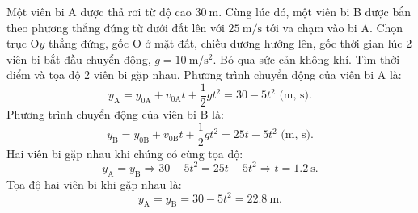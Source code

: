 \begin{enumerate}[label=\bfseries Câu \arabic*:]
\cauhoi
{Một viên bi A được thả rơi từ độ cao $\SI{30}{\meter}$. Cùng lúc đó, một viên bi B được bắn theo phương thẳng đứng từ dưới đất lên với $\SI{25}{\meter/\second}$ tới va chạm vào bi A. Chọn trục O$y$ thẳng đứng, gốc O ở mặt đất, chiều dương hướng lên, gốc thời gian lúc 2 viên bi bắt đầu chuyển động, $g=\SI{10}{\meter/\second^2}$. Bỏ qua sức cản không khí. Tìm thời điểm và tọa độ 2 viên bi gặp nhau.
}
\loigiai
{	Phương trình chuyển động của viên bi A là:
	$$y_{\text{A}}=y_{0\text{A}}+v_{0\text{A}}t+\dfrac{1}{2}gt^2=30-5t^2 \textrm{ (m, s)}.$$
	Phương trình chuyển động của viên bi B là:
	$$y_{\text{B}}=y_{0\text{B}}+v_{0\text{B}}t+\dfrac{1}{2}gt^2=25t-5t^2\textrm{ (m, s)}.$$
	Hai viên bi gặp nhau khi chúng có cùng tọa độ:
	$$y_{\text{A}}=y_{\text{B}}\Rightarrow 30-5t^2=25t-5t^2 \Rightarrow t=\SI{1.2}{\second}.$$
	Tọa độ hai viên bi khi gặp nhau là:
	$$y_{\text{A}}=y_{\text{B}}=30-5t^2=\SI{22.8}{\meter}.$$
}
\end{enumerate}